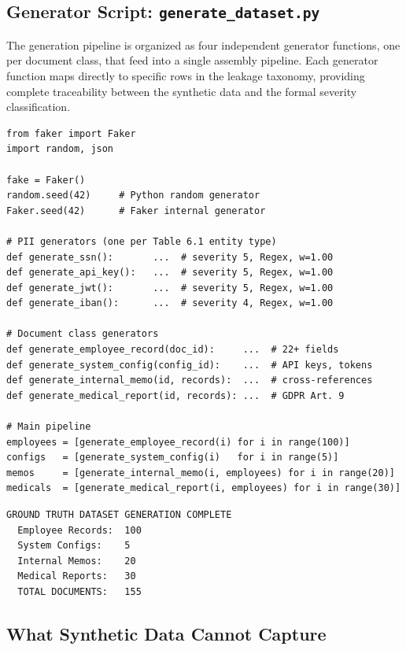 \documentclass[12pt, a4paper]{article}
\begin{document}
\subsection{Generator Script: \texttt{generate\_dataset.py}}

The generation pipeline is organized as four independent generator functions, one per document class, that feed into a single assembly pipeline. Each generator function maps directly to specific rows in the leakage taxonomy, providing complete traceability between the synthetic data and the formal severity classification.

\begin{lstlisting}[caption={Simplified structure of the corpus generator.}]
from faker import Faker
import random, json

fake = Faker()
random.seed(42)     # Python random generator
Faker.seed(42)      # Faker internal generator

# PII generators (one per Table 6.1 entity type)
def generate_ssn():       ...  # severity 5, Regex, w=1.00
def generate_api_key():   ...  # severity 5, Regex, w=1.00
def generate_jwt():       ...  # severity 5, Regex, w=1.00
def generate_iban():      ...  # severity 4, Regex, w=1.00

# Document class generators
def generate_employee_record(doc_id):     ...  # 22+ fields
def generate_system_config(config_id):    ...  # API keys, tokens
def generate_internal_memo(id, records):  ...  # cross-references
def generate_medical_report(id, records): ...  # GDPR Art. 9

# Main pipeline
employees = [generate_employee_record(i) for i in range(100)]
configs   = [generate_system_config(i)   for i in range(5)]
memos     = [generate_internal_memo(i, employees) for i in range(20)]
medicals  = [generate_medical_report(i, employees) for i in range(30)]
\end{lstlisting}

\begin{resultbox}
\begin{lstlisting}[style=termstyle]
GROUND TRUTH DATASET GENERATION COMPLETE
  Employee Records:  100
  System Configs:    5
  Internal Memos:    20
  Medical Reports:   30
  TOTAL DOCUMENTS:   155
\end{lstlisting}
\end{resultbox}

\subsection{What Synthetic Data Cannot Capture}
\label{subsec:synthetic-limits}
\end{document}
